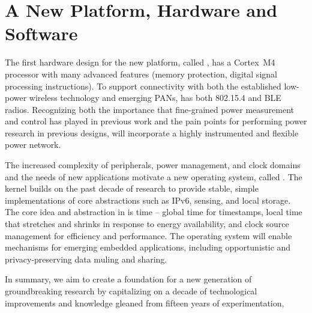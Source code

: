 \section{A New Platform, Hardware and Software}

The first hardware design for the new platform, called \namedevice, has a
Cortex~M4 processor with many advanced features (memory protection,
digital signal processing instructions).  To support connectivity with
both the established low-power wireless technology and emerging PANs,
\namedevice has both 802.15.4 and BLE radios.  Recognizing both the
importance that fine-grained power measurement and control has played
in previous work and the pain points for performing power research in
previous designs, \namedevice will incorporate a highly instrumented and
flexible power network.

The increased complexity of peripherals, power management, and clock
domains and the needs of new applications
motivate a new operating system, called \nameos. The \nameos kernel builds
on the past decade of research to provide stable, simple implementations of
core abstractions such as IPv6, sensing, and local storage. 
The core idea and abstraction in \nameos is time -- global time for timestamps,
local time that stretches and shrinks in response to energy availability, and
clock source management for efficiency and performance.
The operating system will enable mechanisms for emerging embedded applications,
including opportunistic and privacy-preserving data muling and sharing.

In summary, we aim to create a foundation for a new generation of
groundbreaking research by capitalizing on a decade of technological
improvements and knowledge gleaned from fifteen years of
experimentation,




